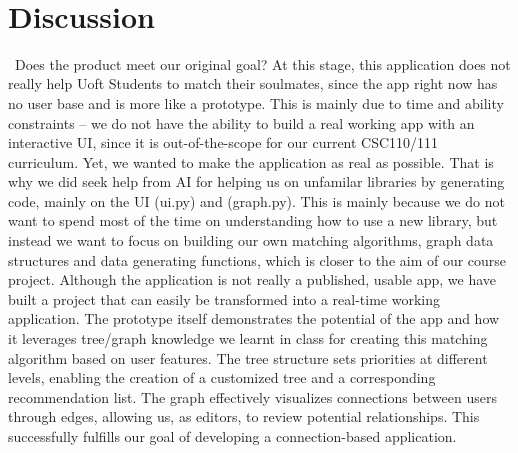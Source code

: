 \documentclass[fontsize=11pt]{article}
\begin{document}
\\
\section{Discussion}
\ Does the product meet our original goal?
At this stage, this application does not really help Uoft Students to match their soulmates, since the app right now has no user base and is more like a prototype.
This is mainly due to time and ability constraints -- we do not have the ability to build a real working app with an interactive UI, since it is out-of-the-scope for our current CSC110/111 curriculum. Yet, we wanted to make the application as real as possible. That is why we did seek help from AI for helping us on unfamilar libraries by generating code, mainly on the UI (ui.py) and (graph.py). This is mainly because we do not want to spend most of the time on understanding how to use a new library, but instead we want to focus on building our own matching algorithms, graph data structures and data generating functions, which is closer to the aim of our course project.
Although the application is not really a published, usable app, we have built a project that can easily be transformed into a real-time working application. The prototype itself demonstrates the potential of the app and how it leverages tree/graph knowledge we learnt in class for creating this matching algorithm based on user features. The tree structure sets priorities at different levels, enabling the creation of a customized tree and a corresponding recommendation list. The graph effectively visualizes connections between users through edges, allowing us, as editors, to review potential relationships. 
This successfully fulfills our goal of developing a connection-based application.
\end{document}
